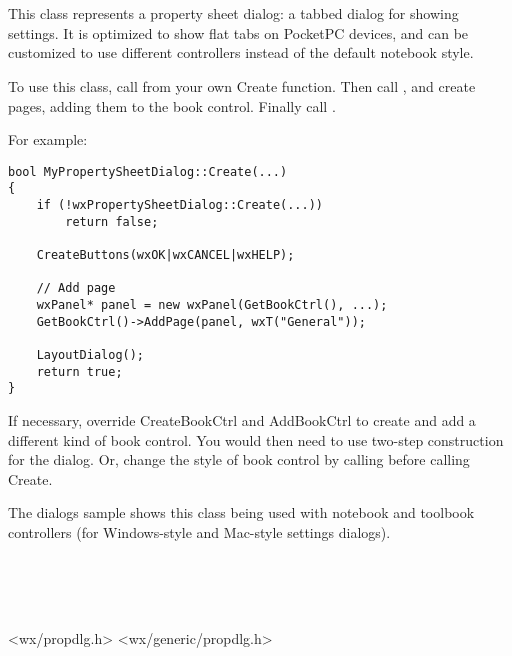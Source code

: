 \section{}\label{wxpropertysheetdialog}

This class represents a property sheet dialog: a tabbed dialog
for showing settings. It is optimized to show flat tabs
on PocketPC devices, and can be customized to use different
controllers instead of the default notebook style.

To use this class, call  from your own
Create function. Then call , and create pages, adding them to the book control.
Finally call .

For example:

\begin{verbatim}
bool MyPropertySheetDialog::Create(...)
{
    if (!wxPropertySheetDialog::Create(...))
        return false;

    CreateButtons(wxOK|wxCANCEL|wxHELP);

    // Add page
    wxPanel* panel = new wxPanel(GetBookCtrl(), ...);
    GetBookCtrl()->AddPage(panel, wxT("General"));

    LayoutDialog();
    return true;
}
\end{verbatim}

If necessary, override CreateBookCtrl and AddBookCtrl to create and add a different
kind of book control. You would then need to use two-step construction for the dialog.
Or, change the style of book control by calling  
before calling Create.

The dialogs sample shows this class being used with notebook and toolbook controllers (for
Windows-style and Mac-style settings dialogs).


\\
\\
\\


<wx/propdlg.h>
<wx/generic/propdlg.h>



